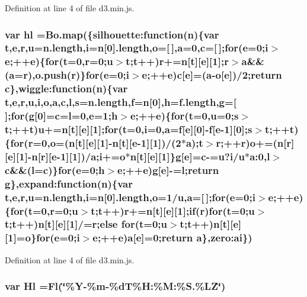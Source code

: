 Definition at line 4 of file d3.\+min.\+js.

\subsubsection[{hl}]{\setlength{\rightskip}{0pt plus 5cm}var hl ={\bf Bo.\+map}(\{silhouette\+:function({\bf n})\{var t,{\bf e},{\bf r},u=n.\+length,{\bf i}={\bf n}[0].length,{\bf o}=[$\,$],{\bf a}=0,{\bf c}=[$\,$];{\bf for}({\bf e}=0;{\bf i}$>${\bf e};++{\bf e})\{{\bf for}(t=0,{\bf r}=0;u$>$t;t++){\bf r}+={\bf n}[t][{\bf e}][1];{\bf r}$>${\bf a}\&\&({\bf a}={\bf r}),o.\+push({\bf r})\}{\bf for}({\bf e}=0;{\bf i}$>${\bf e};++{\bf e}){\bf c}[{\bf e}]=({\bf a}-\/{\bf o}[{\bf e}])/2;{\bf return} {\bf c}\},wiggle\+:function({\bf n})\{var t,{\bf e},{\bf r},u,{\bf i},{\bf o},{\bf a},{\bf c},l,s=n.\+length,{\bf f}={\bf n}[0],h=f.\+length,g=[$\,$];{\bf for}(g[0]={\bf c}=l=0,{\bf e}=1;h$>${\bf e};++{\bf e})\{{\bf for}(t=0,u=0;s$>$t;++t)u+={\bf n}[t][{\bf e}][1];{\bf for}(t=0,{\bf i}=0,{\bf a}={\bf f}[{\bf e}][0]-\/{\bf f}[{\bf e}-\/1][0];s$>$t;++t)\{{\bf for}({\bf r}=0,{\bf o}=({\bf n}[t][{\bf e}][1]-\/{\bf n}[t][{\bf e}-\/1][1])/(2$\ast${\bf a});t$>${\bf r};++{\bf r}){\bf o}+=({\bf n}[{\bf r}][{\bf e}][1]-\/{\bf n}[{\bf r}][{\bf e}-\/1][1])/{\bf a};{\bf i}+={\bf o}$\ast${\bf n}[t][{\bf e}][1]\}g[{\bf e}]={\bf c}-\/=u?{\bf i}/u$\ast$a\+:0,l$>${\bf c}\&\&(l={\bf c})\}{\bf for}({\bf e}=0;h$>${\bf e};++{\bf e})g[{\bf e}]-\/=l;{\bf return} g\},expand\+:function({\bf n})\{var t,{\bf e},{\bf r},u=n.\+length,{\bf i}={\bf n}[0].length,{\bf o}=1/u,{\bf a}=[$\,$];{\bf for}({\bf e}=0;{\bf i}$>${\bf e};++{\bf e})\{{\bf for}(t=0,{\bf r}=0;u$>$t;t++){\bf r}+={\bf n}[t][{\bf e}][1];{\bf if}({\bf r}){\bf for}(t=0;u$>$t;t++){\bf n}[t][{\bf e}][1]/={\bf r};{\bf else} {\bf for}(t=0;u$>$t;t++){\bf n}[t][{\bf e}][1]={\bf o}\}{\bf for}({\bf e}=0;{\bf i}$>${\bf e};++{\bf e}){\bf a}[{\bf e}]=0;{\bf return} {\bf a}\},zero\+:ai\})}\label{d3_8min_8js_af1cb195646230076ae2602e753cb18e5}


Definition at line 4 of file d3.\+min.\+js.

\subsubsection[{Hl}]{\setlength{\rightskip}{0pt plus 5cm}var Hl ={\bf Fl}(\char`\"{}\%Y-\/\%m-\/\%d\+T\%H\+:\%M\+:\%S.\%L\+Z\char`\"{})}\label{d3_8min_8js_a5972a3ee5caaf97b4471cb6b92a89732}


